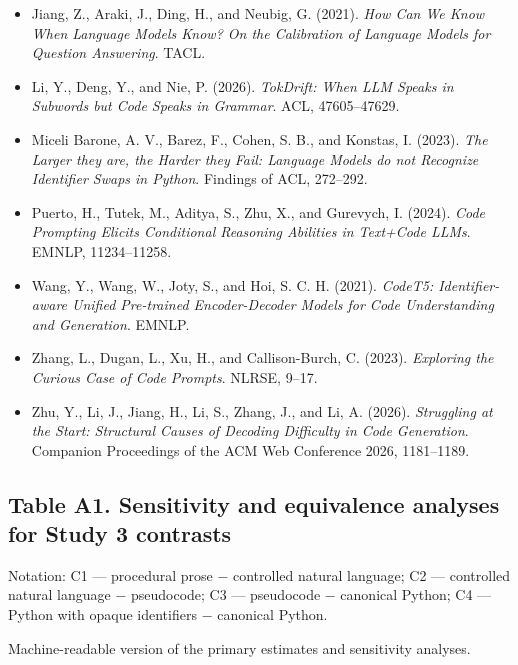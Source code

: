 \documentclass[sn-mathphys-num]{sn-jnl}
\begin{document}
\begin{itemize}
\item Jiang, Z., Araki, J., Ding, H., and Neubig, G. (2021). \emph{How Can We Know When Language Models Know? On the Calibration of Language Models for Question Answering}. TACL.
\item Li, Y., Deng, Y., and Nie, P. (2026). \emph{TokDrift: When LLM Speaks in Subwords but Code Speaks in Grammar}. ACL, 47605--47629.
\item Miceli Barone, A. V., Barez, F., Cohen, S. B., and Konstas, I. (2023). \emph{The Larger they are, the Harder they Fail: Language Models do not Recognize Identifier Swaps in Python}. Findings of ACL, 272--292.
\item Puerto, H., Tutek, M., Aditya, S., Zhu, X., and Gurevych, I. (2024). \emph{Code Prompting Elicits Conditional Reasoning Abilities in Text+Code LLMs}. EMNLP, 11234--11258.
\item Wang, Y., Wang, W., Joty, S., and Hoi, S. C. H. (2021). \emph{CodeT5: Identifier-aware Unified Pre-trained Encoder-Decoder Models for Code Understanding and Generation}. EMNLP.
\item Zhang, L., Dugan, L., Xu, H., and Callison-Burch, C. (2023). \emph{Exploring the Curious Case of Code Prompts}. NLRSE, 9--17.
\item Zhu, Y., Li, J., Jiang, H., Li, S., Zhang, J., and Li, A. (2026). \emph{Struggling at the Start: Structural Causes of Decoding Difficulty in Code Generation}. Companion Proceedings of the ACM Web Conference 2026, 1181--1189.
\end{itemize}

\appendix

\subsection*{Table A1. Sensitivity and equivalence analyses for Study 3 contrasts}

Notation: C1 — procedural prose $-$ controlled natural language; C2 — controlled natural language $-$ pseudocode; C3 — pseudocode $-$ canonical Python; C4 — Python with opaque identifiers $-$ canonical Python.

Machine-readable version of the primary estimates and sensitivity analyses.
\end{document}
